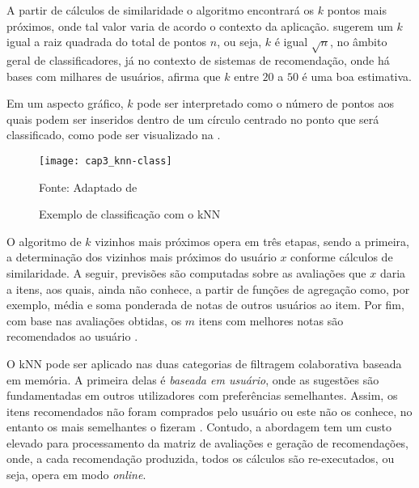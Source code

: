             A partir de cálculos de similaridade o algoritmo encontrará os $k$ pontos mais próximos, onde tal valor varia de acordo o contexto da aplicação.  sugerem um $k$  igual a raiz quadrada do total de pontos $n$, ou seja, $k$ é igual $\sqrt{n}$, no âmbito geral de classificadores, já no contexto de sistemas de recomendação, onde há bases com milhares de usuários,  afirma que $k$ entre $20$ a $50$ é uma boa estimativa. 
            
            Em um aspecto gráfico, $k$ pode ser interpretado como o número de pontos aos quais podem ser inseridos dentro de um círculo centrado no ponto que será classificado, como pode ser visualizado na . 
            
            \begin{figure}[htb]
                \caption{Exemplo de classificação com o kNN}
                \texttt{[image: cap3\_knn-class]}
                \label{fig:cap3_knn-class}
                
                {\footnotesize Fonte: Adaptado de }
            \end{figure}            
            
                 
            O algoritmo de $k$ vizinhos mais próximos opera em três etapas, sendo a primeira, a determinação dos vizinhos mais próximos do usuário $x$ conforme cálculos de similaridade. A seguir, previsões são computadas sobre as avaliações que $x$ daria a itens, aos quais, ainda não conhece, a partir de funções de agregação como, por exemplo, média e soma ponderada de notas de outros usuários ao item. Por fim, com base nas avaliações obtidas, os $m$ itens com melhores notas são recomendados ao usuário \cite{Bobadilla_2013}.
            
            
            O kNN pode ser aplicado nas duas categorias de filtragem colaborativa baseada em memória. A primeira delas é \textit{baseada em usuário}, onde as sugestões são fundamentadas em outros utilizadores com preferências semelhantes. Assim, os itens recomendados não foram comprados pelo usuário ou este não os conhece, no entanto os mais semelhantes o fizeram \cite{Ricci2010}. Contudo, a abordagem tem um custo elevado para processamento da matriz de avaliações e geração de recomendações, onde, a cada recomendação produzida, todos os cálculos são re-executados, ou seja, opera em modo \textit{online}.
            
